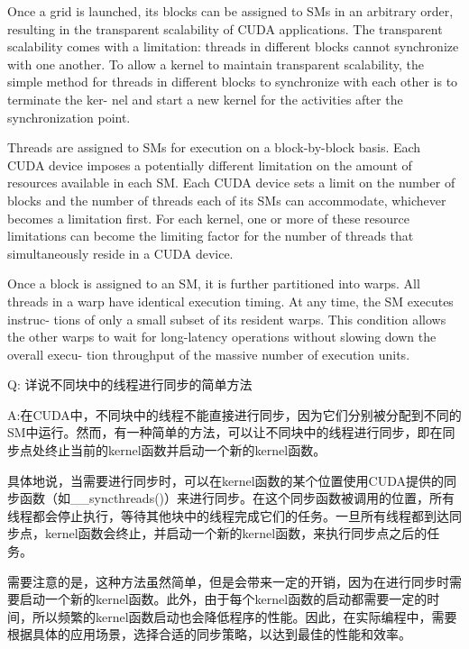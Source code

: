 \documentclass[11pt]{ctexart}
\begin{document}
Once a grid is launched, its blocks can be assigned to SMs in an arbitrary order, resulting in the transparent scalability of CUDA applications. The transparent scalability comes with a limitation: threads in different blocks cannot synchronize with
one another. To allow a kernel to maintain transparent scalability, the simple method
for threads in different blocks to synchronize with each other is to terminate the ker-
nel and start a new kernel for the activities after the synchronization point.

Threads are assigned to SMs for execution on a block-by-block basis. Each CUDA
device imposes a potentially different limitation on the amount of resources available
in each SM. Each CUDA device sets a limit on the number of blocks and the number
of threads each of its SMs can accommodate, whichever becomes a limitation first.
For each kernel, one or more of these resource limitations can become the limiting
factor for the number of threads that simultaneously reside in a CUDA device.

Once a block is assigned to an SM, it is further partitioned into warps. All threads
in a warp have identical execution timing. At any time, the SM executes instruc-
tions of only a small subset of its resident warps. This condition allows the other
warps to wait for long-latency operations without slowing down the overall execu-
tion throughput of the massive number of execution units.

Q: 详说不同块中的线程进行同步的简单方法

A:在CUDA中，不同块中的线程不能直接进行同步，因为它们分别被分配到不同的SM中运行。然而，有一种简单的方法，可以让不同块中的线程进行同步，即在同步点处终止当前的kernel函数并启动一个新的kernel函数。

具体地说，当需要进行同步时，可以在kernel函数的某个位置使用CUDA提供的同步函数（如\_\_syncthreads()）来进行同步。在这个同步函数被调用的位置，所有线程都会停止执行，等待其他块中的线程完成它们的任务。一旦所有线程都到达同步点，kernel函数会终止，并启动一个新的kernel函数，来执行同步点之后的任务。

需要注意的是，这种方法虽然简单，但是会带来一定的开销，因为在进行同步时需要启动一个新的kernel函数。此外，由于每个kernel函数的启动都需要一定的时间，所以频繁的kernel函数启动也会降低程序的性能。因此，在实际编程中，需要根据具体的应用场景，选择合适的同步策略，以达到最佳的性能和效率。
\end{document}
